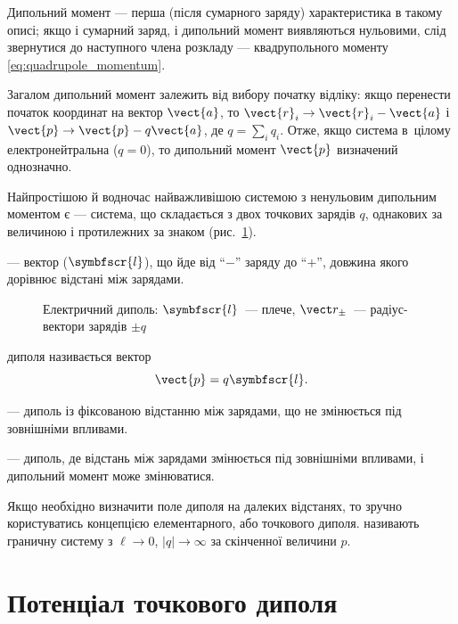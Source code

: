 Дипольний момент --- перша (після сумарного заряду) характеристика в такому описі; якщо і сумарний заряд, і дипольний момент виявляються нульовими, слід звернутися до наступного члена розкладу --- квадрупольного моменту \eqref{eq:quadrupole_momentum}.


Загалом дипольний момент залежить від вибору початку відліку: якщо перенести початок
координат на вектор $\vect{a}$, то $\vect{r}_i \to \vect{r}_i - \vect{a}$ і
$\vect{p} \to \vect{p} - q\vect{a}$, де $q = \sum_i q_i$. Отже, якщо система в~цілому
електронейтральна ($q = 0$), то дипольний момент $\vect{p}$ визначений однозначно.

Найпростішою й водночас найважливішою системою з ненульовим дипольним моментом є  --- система, що складається з
двох точкових зарядів $q$, однакових за величиною і протилежних за знаком (рис.~\ref{tikz:el_dipole}).


 --- вектор ($\symbfscr{l}$), що йде від \enquote{$-$} заряду до
\enquote{$+$}, довжина якого дорівнює відстані між зарядами.


\begin{figure}
	\centering
	\caption{Електричний диполь: $\symbfscr{l}$~--- плече, $\vect r_\pm$~--- радіус-вектори
		зарядів $\pm q$}
	\label{tikz:el_dipole}
\end{figure}
 диполя називається вектор
\begin{equation}
	\vect{p} = q\symbfscr{l}.
\end{equation}


 --- диполь із фіксованою відстанню між зарядами, що не
змінюється під зовнішніми впливами.


 --- диполь, де відстань між зарядами змінюється під зовнішніми
впливами, і дипольний момент може змінюватися.

Якщо необхідно визначити поле диполя на далеких відстанях, то зручно користуватись концепцією елементарного, або точкового диполя.
 називають граничну систему з $\ell \to 0$, $|q| \to \infty$ за скінченної величини $p$.



\section{Потенціал точкового диполя}\label{sec:DipolePotential}\hypertarget{point-dipole-potential}{}

